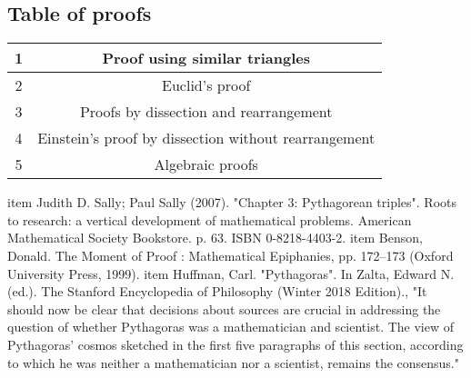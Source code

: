 \documentclass[]{hdsr}
\begin{document}
\subsection{Table of proofs}
\begin{center}
 \begin{tabular}{||c | c||} 
\hline
 1 & Proof using similar triangles \\ 
 \hline
 2 & Euclid's proof \\
 \hline
 3 & Proofs by dissection and rearrangement \\
 \hline
 4 & Einstein's proof by dissection without rearrangement \\
 \hline
 5 & Algebraic proofs \\ [1ex] 
 \hline
\end{tabular}
\newline
\end{center}

    \begin{thebibliography}{1}

        item {
            Judith D. Sally; Paul Sally (2007). "Chapter 3: Pythagorean triples". Roots to research: a vertical development of mathematical problems. American Mathematical Society Bookstore. p. 63. ISBN 0-8218-4403-2.}
        item {
             Benson, Donald. The Moment of Proof : Mathematical Epiphanies, pp. 172–173 (Oxford University Press, 1999).}
        item {
            Huffman, Carl. "Pythagoras". In Zalta, Edward N. (ed.). The Stanford Encyclopedia of Philosophy (Winter 2018 Edition)., "It should now be clear that decisions about sources are crucial in addressing the question of whether Pythagoras was a mathematician and scientist. The view of Pythagoras' cosmos sketched in the first five paragraphs of this section, according to which he was neither a mathematician nor a scientist, remains the consensus."}
    \end{thebibliography}
\end{document}
